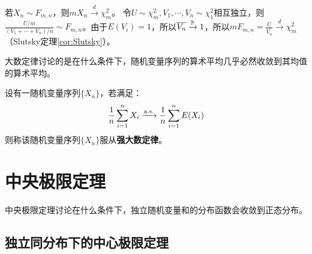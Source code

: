 \begin{example}
    若$X_n \sim F_{m,n}$，则$mX_n \xrightarrow{d} \chi^2_m$。
    令$U \sim \chi^2_m,V_1,\cdots ,V_n \sim \chi^2_1$相互独立，则$\frac{U/m}{(V_1+\cdots+V_n)/n} \sim F_{m,n}$。由于$E(V_i)=1$，所以$\overline{V_n} \xrightarrow{\P} 1$，所以$mF_{m,n}=\frac{U}{\overline{V_n}} \xrightarrow{d} \chi^2_m$（Slutsky定理\ref{cor:Slutsky}）。
\end{example}

大数定律讨论的是在什么条件下，随机变量序列的算术平均几乎必然收敛到其均值的算术平均。

\begin{definition}[强大数定律的一般形式]\label{def:strong_large_number_law}
    设有一随机变量序列$\{ X_n \}$，若满足：
    \[ \frac1n \sum_{i=1}^n X_i \xrightarrow{\as} \frac1n \sum_{i=1}^n E(X_i) \]
    则称该随机变量序列$\{ X_n \}$服从\textbf{强大数定律}。
\end{definition}




\section{中央极限定理}

中央极限定理讨论在什么条件下，独立随机变量和的分布函数会收敛到正态分布。

\subsection{独立同分布下的中心极限定理}

